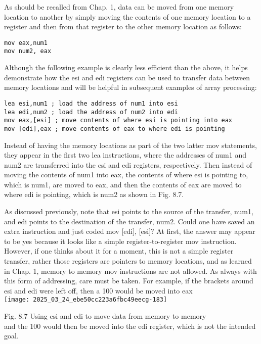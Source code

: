 \documentclass[10pt]{article}
\begin{document}
As should be recalled from Chap. 1, data can be moved from one memory location to another by simply moving the contents of one memory location to a register and then from that register to the other memory location as follows:

\begin{verbatim}
mov eax,num1
mov num2, eax
\end{verbatim}

Although the following example is clearly less efficient than the above, it helps demonstrate how the esi and edi registers can be used to transfer data between memory locations and will be helpful in subsequent examples of array processing:

\begin{verbatim}
lea esi,num1 ; load the address of num1 into esi
lea edi,num2 ; load the address of num2 into edi
mov eax,[esi] ; move contents of where esi is pointing into eax
mov [edi],eax ; move contents of eax to where edi is pointing
\end{verbatim}

Instead of having the memory locations as part of the two latter mov statements, they appear in the first two lea instructions, where the addresses of num1 and num2 are transferred into the esi and edi registers, respectively. Then instead of moving the contents of num1 into eax, the contents of where esi is pointing to, which is num1, are moved to eax, and then the contents of eax are moved to where edi is pointing, which is num2 as shown in Fig. 8.7.

As discussed previously, note that esi points to the source of the transfer, num1, and edi points to the destination of the transfer, num2. Could one have saved an extra instruction and just coded mov [edi], [esi]? At first, the answer may appear to be yes because it looks like a simple register-to-register mov instruction. However, if one thinks about it for a moment, this is not a simple register transfer, rather those registers are pointers to memory locations, and as learned in Chap. 1, memory to memory mov instructions are not allowed. As always with this form of addressing, care must be taken. For example, if the brackets around esi and edi were left off, then a 100 would be moved into eax\\
\texttt{[image: 2025\_03\_24\_ebe50cc223a6fbc49eecg-183]}

Fig. 8.7 Using esi and edi to move data from memory to memory\\
and the 100 would then be moved into the edi register, which is not the intended goal.
\end{document}
